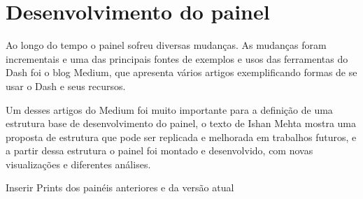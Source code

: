 \chapter{Desenvolvimento do painel}\label{cap_trabalho_academico}

Ao longo do tempo o painel sofreu diversas mudanças. As mudanças foram incrementais e uma das principais fontes de exemplos e usos das ferramentas do Dash foi o blog Medium, que apresenta vários artigos exemplificando formas de se usar o Dash e seus recursos.

Um desses artigos do Medium foi muito importante para a definição de uma estrutura base de desenvolvimento do painel, o texto de Ishan Mehta \cite{medium1} mostra uma proposta de estrutura que pode ser replicada e melhorada em trabalhos futuros, e a partir dessa estrutura o painel foi montado e desenvolvido, com novas visualizações e diferentes análises.

Inserir Prints dos painéis anteriores e da versão atual
